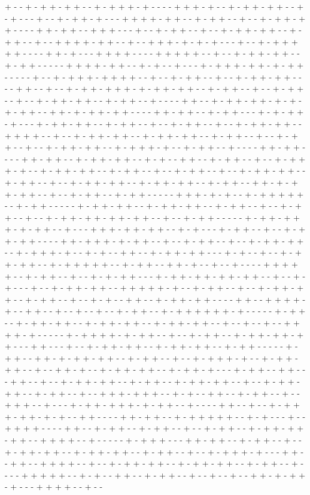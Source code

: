 + - - + - + + - + + - - + - + + + - + - - - - + + + - + - - + - + + - + + - - + - + - - - + - - + - + + - + - - - + + + + - + + - - + - + + - - + - - + - + + - + + - - - - + + - + + - - + + + - - - + - - + - + + - - + - - + - + + - + + - - + - + + - - + - - + + + + - + + - - + - - + + + - + - + - + - - - + - - + - + + + + + - - - - + + - + - - - + + + + - - - - + + + + + - - + - - + - + + - + + - - + - + + - - - - - + + + + - + + - - + - + - - + - - - + - + + + - + + - + - + + - - - - - + - - + - + + + - + + + + - - + - - + - + + - - + - - + - + + - + + - - - - + + - - + - - + - + + - + + + - + - + + - + + - - + - + + - - + - - + - + + - - + - - + - + + - + + - - + - + + - - + - - - - + + - - + - + + - + + - + - + - + - + + - - + + - + - + + - + + - - - - + + - + + - - + - + + - - - + - + - + + - + - - - + - + + - + + - - + - + + - - + - - + - + + - - + - - + - + + - + + - - + + + + - - + - - + - + + - + + - - + - + + - + + - - + - + + - - + - - + - + + - - + - - + - + + - + + - - + - + + + - + - - + - + + - - + - - - - + + - + + - - - - + + - + + - - + - + + - + + - - + - + - - + + - - + - + + - - + - - + - + + + - + - - + - + + - + + - - + - + + - - + - - + - + + - - + - - + - + + - + + - - + - + + - - + - - + - + + - + + - - + - + + - + + - - + - + + - - + + - + - + + - + + - - + - - + - + + - - + - + + - - - - - + + + - + - + - - + - + + + + + - - + - + + - - - - - + - + + - + + - - + - + + - + + - - + - + + - - + - - + - + + - - + - - + - + + - + + - + + - + + - - + - - + - + + - - - - - + - + + - + + + - + - + + - - + - - - + + + - + + - + + - - + - + - - - + - + + - - + - - + - + + - + + - - - - + + - + + + - + - + + - - + - - + - + + - - + - - + - + + - + + - - + - + + + - + - - + - + - - + + - - + - + + - + + - - - + - + - - + - - + - + + - + + - - + - + + + + + - - + - + + - - + + - + - - + - - + - - - - + + + + + - - + - + + - - + - - + - + - + + - - - + - + + - + + - + + - + + - - + - - + - + - - - + - - + - + + - + + - - + + + + + - + - - + - + + - - + - - + - + + - + + - - + - + + - - + - - + - + - - + + - - + - + + - + + - - - - + + - - + + + + - + - - + + - - + - - + - - + - - + - + + - - + - + + + + + + - + - - - - - + - + + - - + - + + - + + - - + - + + - + + - - + - + + - + + - - + - - + - - + - - + + + + - + - - - - - + - + + + + - + - + + - - + - - + - + + - - + - + + - + + - + + - - - + + - - - + - - + - + + - + + - - + - + + - + + - - + - + + - - - - - + - + + - - + + - + - + + - + + - - + - + + - - + - - + - + + + - + - - + - + + - + + - - + - - + + - + - - + - + + - + + - - + - + + - + - - - + - + + - - + + - - - + + - - + - - + - + + - + + - - + - + + - - + - + + - + + - - + - - + - + + - + + - - + - + + - - + - - + + + - + + + - - + - + - - + + - - + - + + - - + - - + + + - - + - - - + - + + - + + + - + - + + - - + - - - - + + - - + - - + - + + + - + + - + - + - - + + - - - - + + - + + - - + - + + + + + - - + - + - - - + - - + + + + - - - - + + - - + - + + - - + - + + - - + - - + - + + - - + - + + - + + - + + - - + + + + - - + - - - - - + - + + + - - - + + - + + - - + - + + - - + - - + - + + - + + - - + - + + - + + - - + - + + - - + - - + - + + + - + - - - + + - - + + - - + + + + - - + - - + - + + - + + - - + - + + - + + - - + - + + - - + - - - - + + + + + - - + - + - - + + - - + - + + - - + - - + - - + - - + + - + - + + - + - - - + + + + - - + - - 